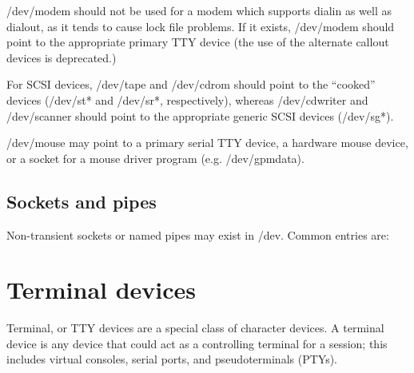 \begin{nodelist}
\end{nodelist}

\noindent
{\file /dev/modem} should not be used for a modem which supports
dialin as well as dialout, as it tends to cause lock file problems.
If it exists, {\file /dev/modem} should point to the appropriate
primary TTY device (the use of the alternate callout devices is
deprecated.)

For SCSI devices, {\file /dev/tape} and {\file /dev/cdrom} should
point to the ``cooked'' devices ({\file /dev/st*} and {\file
/dev/sr*}, respectively), whereas {\file /dev/cdwriter} and {\file
/dev/scanner} should point to the appropriate generic SCSI devices
({\file /dev/sg*}).

{\file /dev/mouse} may point to a primary serial TTY device, a
hardware mouse device, or a socket for a mouse driver program
(e.g. {\file /dev/gpmdata}).

\subsection{Sockets and pipes}

Non-transient sockets or named pipes may exist in {\file /dev}.
Common entries are:

\begin{nodelist}
\end{nodelist}

\section{Terminal devices}

Terminal, or TTY devices are a special class of character devices.  A
terminal device is any device that could act as a controlling terminal
for a session; this includes virtual consoles, serial ports, and
pseudoterminals (PTYs).

